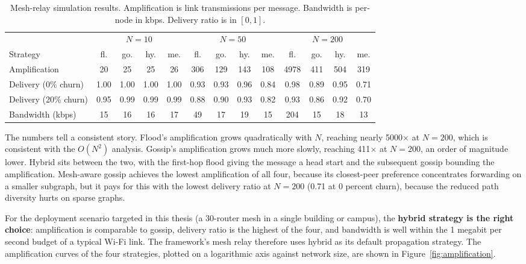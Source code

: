 \begin{table}[H]
\centering
\caption{Mesh-relay simulation results. Amplification is link transmissions per message. Bandwidth is per-node in kbps. Delivery ratio is in $[0, 1]$.}
\label{tab:mesh}
\footnotesize
\setlength{\tabcolsep}{3.5pt}
\begin{tabular}{|l|c|c|c|c|c|c|c|c|c|c|c|c|}
\hline
& \multicolumn{4}{c|}{$N=10$} & \multicolumn{4}{c|}{$N=50$} & \multicolumn{4}{c|}{$N=200$} \\
\cline{2-13}
Strategy & fl. & go. & hy. & me. & fl. & go. & hy. & me. & fl. & go. & hy. & me. \\
\hline
Amplification & 20 & 25 & 25 & 26 & 306 & 129 & 143 & 108 & 4978 & 411 & 504 & 319 \\
\hline
Delivery (0\% churn) & 1.00 & 1.00 & 1.00 & 1.00 & 0.93 & 0.93 & 0.96 & 0.84 & 0.98 & 0.89 & 0.95 & 0.71 \\
\hline
Delivery (20\% churn) & 0.95 & 0.99 & 0.99 & 0.99 & 0.88 & 0.90 & 0.93 & 0.82 & 0.93 & 0.86 & 0.92 & 0.70 \\
\hline
Bandwidth (kbps) & 15 & 16 & 16 & 17 & 49 & 17 & 19 & 15 & 204 & 15 & 18 & 13 \\
\hline
\end{tabular}
\end{table}

The numbers tell a consistent story. Flood's amplification grows quadratically with $N$, reaching nearly 5000$\times$ at $N=200$, which is consistent with the $O(N^2)$ analysis. Gossip's amplification grows much more slowly, reaching 411$\times$ at $N=200$, an order of magnitude lower. Hybrid sits between the two, with the first-hop flood giving the message a head start and the subsequent gossip bounding the amplification. Mesh-aware gossip achieves the lowest amplification of all four, because its closest-peer preference concentrates forwarding on a smaller subgraph, but it pays for this with the lowest delivery ratio at $N=200$ (0.71 at 0 percent churn), because the reduced path diversity hurts on sparse graphs.

For the deployment scenario targeted in this thesis (a 30-router mesh in a single building or campus), the \textbf{hybrid strategy is the right choice}: amplification is comparable to gossip, delivery ratio is the highest of the four, and bandwidth is well within the 1 megabit per second budget of a typical Wi-Fi link. The framework's mesh relay therefore uses hybrid as its default propagation strategy. The amplification curves of the four strategies, plotted on a logarithmic axis against network size, are shown in Figure~\ref{fig:amplification}.

